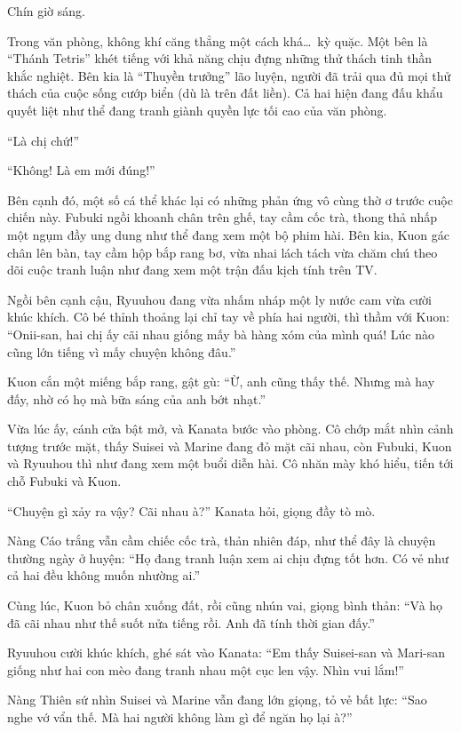 \documentclass[../main.tex]{subfiles}
\begin{document}
Chín giờ sáng.

Trong văn phòng, không khí căng thẳng một cách khá\dots\ kỳ quặc. Một bên là ``Thánh Tetris'' khét tiếng với khả năng chịu đựng những thử thách tinh thần khắc nghiệt. Bên kia là ``Thuyền trưởng'' lão luyện, người đã trải qua đủ mọi thử thách của cuộc sống cướp biển (dù là trên đất liền). Cả hai hiện đang đấu khẩu quyết liệt như thể đang tranh giành quyền lực tối cao của văn phòng.

``Là chị chứ!''

``Không! Là em mới đúng!''

Bên cạnh đó, một số cá thể khác lại có những phản ứng vô cùng thờ ơ trước cuộc chiến này. Fubuki ngồi khoanh chân trên ghế, tay cầm cốc trà, thong thả nhấp một ngụm đầy ung dung như thể đang xem một bộ phim hài. Bên kia, Kuon gác chân lên bàn, tay cầm hộp bắp rang bơ, vừa nhai lách tách vừa chăm chú theo dõi cuộc tranh luận như đang xem một trận đấu kịch tính trên TV.

Ngồi bên cạnh cậu, Ryuuhou đang vừa nhấm nháp một ly nước cam vừa cười khúc khích. Cô bé thỉnh thoảng lại chỉ tay về phía hai người, thì thầm với Kuon: ``Onii-san, hai chị ấy cãi nhau giống mấy bà hàng xóm của mình quá! Lúc nào cũng lớn tiếng vì mấy chuyện không đâu.''

Kuon cắn một miếng bắp rang, gật gù: ``Ừ, anh cũng thấy thế. Nhưng mà hay đấy, nhờ có họ mà bữa sáng của anh bớt nhạt.''

Vừa lúc ấy, cánh cửa bật mở, và Kanata bước vào phòng. Cô chớp mắt nhìn cảnh tượng trước mặt, thấy Suisei và Marine đang đỏ mặt cãi nhau, còn Fubuki, Kuon và Ryuuhou thì như đang xem một buổi diễn hài. Cô nhăn mày khó hiểu, tiến tới chỗ Fubuki và Kuon.


``Chuyện gì xảy ra vậy? Cãi nhau à?'' Kanata hỏi, giọng đầy tò mò.

Nàng Cáo trắng vẫn cầm chiếc cốc trà, thản nhiên đáp, như thể đây là chuyện thường ngày ở huyện: ``Họ đang tranh luận xem ai chịu đựng tốt hơn. Có vẻ như cả hai đều không muốn nhường ai.''

Cùng lúc, Kuon bỏ chân xuống đất, rồi cũng nhún vai, giọng bình thản: ``Và họ đã cãi nhau như thế suốt nửa tiếng rồi. Anh đã tính thời gian đấy.''

Ryuuhou cười khúc khích, ghé sát vào Kanata: ``Em thấy Suisei-san và Mari-san giống như hai con mèo đang tranh nhau một cục len vậy. Nhìn vui lắm!''

Nàng Thiên sứ nhìn Suisei và Marine vẫn đang lớn giọng, tỏ vẻ bất lực: ``Sao nghe vớ vẩn thế. Mà hai người không làm gì để ngăn họ lại à?''
\end{document}
